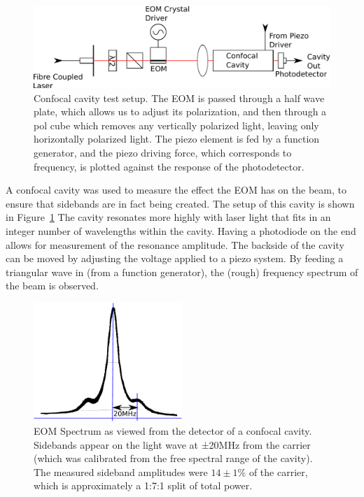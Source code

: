 \begin{figure}
  \includegraphics[width=\textwidth]{figures/cavity.pdf}
  \caption{Confocal cavity test setup.  The EOM is passed through a half wave plate, which allows us to adjust its polarization, and then through a pol cube which removes any vertically polarized light, leaving only horizontally polarized light.  The piezo element is fed by a function generator, and the piezo driving force, which corresponds to frequency, is plotted against the response of the photodetector.}
  \label{cavity}
\end{figure}

A confocal cavity was used to measure the effect the EOM has on the beam, to ensure that sidebands are in fact being created.  The setup of this cavity is shown in Figure~\ref{cavity}  The cavity resonates more highly with laser light that fits in an integer number of wavelengths within the cavity.  Having a photodiode on the end allows for measurement of the resonance amplitude.  The backside of the cavity can be moved by adjusting the voltage applied to a piezo system.  By feeding a triangular wave in (from a function generator), the (rough) frequency spectrum of the beam is observed. \\


\begin{figure}
  \centering\includegraphics[width=0.5\textwidth]{figures/eom_wave.pdf}
  \caption{EOM Spectrum as viewed from the detector of a confocal cavity.  Sidebands appear on the light wave at ±20MHz from the carrier (which was calibrated from the free spectral range of the cavity). The measured sideband amplitudes were $14\pm1$\% of the carrier, which is approximately a 1:7:1 split of total power.}
  \label{fig:eom_wave}
\end{figure}

